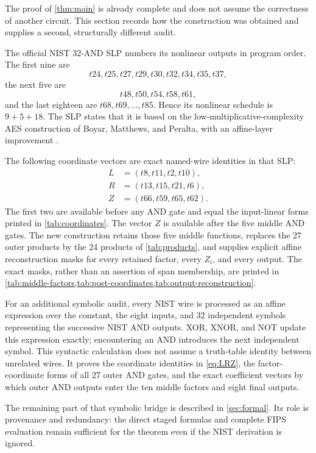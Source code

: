 \documentclass[11pt]{article}
\theoremstyle{definition}
\begin{document}
The proof of \cref{thm:main} is already complete and does not assume the correctness of another
circuit.  This section records how the construction was obtained and supplies a second, structurally
different audit.

The official NIST 32-AND SLP numbers its nonlinear outputs in program order.  The first nine are
\[
 t24,t25,t27,t29,t30,t32,t34,t35,t37,
\]
the next five are
\[
 t48,t50,t54,t58,t61,
\]
and the last eighteen are \(t68,t69,\ldots,t85\).  Hence its nonlinear schedule is
\(9+5+18\).  The SLP states that it is based on the low-multiplicative-complexity AES construction of
Boyar, Matthews, and Peralta, with an affine-layer improvement
\cite{nistAES32SLP,boyarMatthewsPeralta2013}.

The following coordinate vectors are exact named-wire identities in that SLP:
\begin{equation}
\begin{aligned}
 L&=(t8,t11,t2,t10),\\
 R&=(t13,t15,t21,t6),\\
 Z&=(t66,t59,t65,t62).
\end{aligned}
\label{eq:LRZ}
\end{equation}
The first two are available before any AND gate and equal the input-linear forms printed in
\cref{tab:coordinates}.  The vector \(Z\) is available after the five middle AND gates.  The new
construction retains those five middle functions, replaces the 27 outer products by the 24 products
of \cref{tab:products}, and supplies explicit affine reconstruction masks for every retained factor,
every \(Z_i\), and every output.  The exact masks, rather than an assertion of span membership, are
printed in \cref{tab:middle-factors,tab:post-coordinates,tab:output-reconstruction}.

For an additional symbolic audit, every NIST wire is processed as an affine expression over the
constant, the eight inputs, and 32 independent symbols representing the successive NIST AND outputs.
XOR, XNOR, and NOT update this expression exactly; encountering an AND introduces the next independent
symbol.  This syntactic calculation does not assume a truth-table identity between unrelated wires.
It proves the coordinate identities in \cref{eq:LRZ}, the factor-coordinate forms of all 27 outer
AND gates, and the exact coefficient vectors by which outer AND outputs enter the ten middle factors
and eight final outputs.

The remaining part of that symbolic bridge is described in \cref{sec:formal}.  Its role is
provenance and redundancy: the direct staged formulas and complete FIPS evaluation remain sufficient
for the theorem even if the NIST derivation is ignored.
\end{document}
